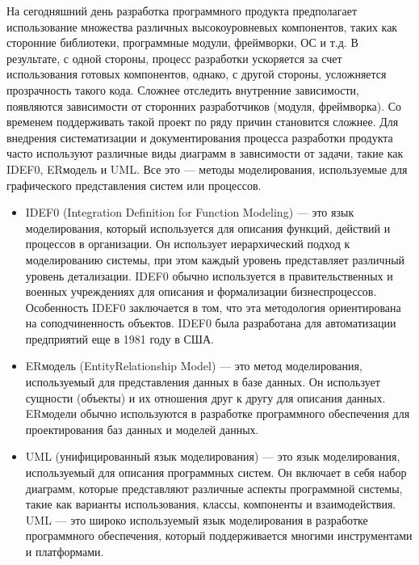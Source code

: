 \documentclass[letterpaper,10pt,russian]{sphinxmanual}
\begin{document}
\sphinxAtStartPar
На сегодняшний день разработка программного продукта предполагает использование множества различных высокоуровневых компонентов, таких как сторонние библиотеки, программные модули, фреймворки, ОС и т.д. В результате, с одной стороны, процесс разработки ускоряется за счет использования готовых компонентов, однако, с другой стороны, усложняется прозрачность такого кода. Сложнее отследить внутренние зависимости, появляются зависимости от сторонних разработчиков (модуля, фреймворка). Со временем поддерживать такой проект по ряду причин становится сложнее. Для внедрения систематизации и документирования процесса разработки продукта часто используют различные виды диаграмм в зависимости от задачи, такие как IDEF0, ER\sphinxhyphen{}модель и UML. Все это — методы моделирования, используемые для графического представления систем или процессов.
\begin{itemize}
\item {} 
\sphinxAtStartPar
IDEF0 (Integration Definition for Function Modeling) — это язык моделирования, который используется для описания функций, действий и процессов в организации. Он использует иерархический подход к моделированию системы, при этом каждый уровень представляет различный уровень детализации. IDEF0 обычно используется в правительственных и военных учреждениях для описания и формализации бизнес\sphinxhyphen{}процессов. Особенность IDEF0 заключается в том, что эта методология ориентирована на соподчиненность объектов. IDEF0 была разработана для автоматизации предприятий еще в 1981 году в США.

\item {} 
\sphinxAtStartPar
ER\sphinxhyphen{}модель (Entity\sphinxhyphen{}Relationship Model) — это метод моделирования, используемый для представления данных в базе данных. Он использует сущности (объекты) и их отношения друг к другу для описания данных. ER\sphinxhyphen{}модели обычно используются в разработке программного обеспечения для проектирования баз данных и моделей данных.

\item {} 
\sphinxAtStartPar
UML (унифицированный язык моделирования) — это язык моделирования, используемый для описания программных систем. Он включает в себя набор диаграмм, которые представляют различные аспекты программной системы, такие как варианты использования, классы, компоненты и взаимодействия. UML — это широко используемый язык моделирования в разработке программного обеспечения, который поддерживается многими инструментами и платформами.

\end{itemize}
\end{document}
